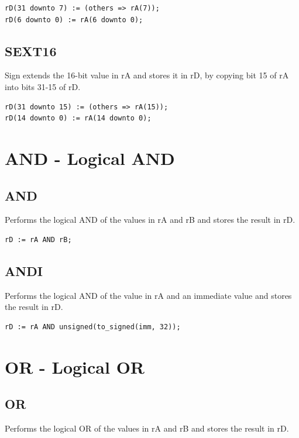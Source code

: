 \documentclass{UoYCSproject}
\begin{document}
\begin{lstlisting}
rD(31 downto 7) := (others => rA(7));
rD(6 downto 0) := rA(6 downto 0);
\end{lstlisting}

\subsection{SEXT16}

Sign extends the 16-bit value in rA and stores it in rD, by copying bit 15 of rA into bits 31-15 of rD.

\begin{lstlisting}
rD(31 downto 15) := (others => rA(15));
rD(14 downto 0) := rA(14 downto 0);
\end{lstlisting}

\section{AND - Logical AND}

\subsection{AND}

Performs the logical AND of the values in rA and rB and stores the result in rD.

\begin{lstlisting}
rD := rA AND rB;
\end{lstlisting}

\subsection{ANDI}

Performs the logical AND of the value in rA and an immediate value and stores the result in rD.

\begin{lstlisting}
rD := rA AND unsigned(to_signed(imm, 32));
\end{lstlisting}

\section{OR - Logical OR}

\subsection{OR}

Performs the logical OR of the values in rA and rB and stores the result in rD.
\end{document}
